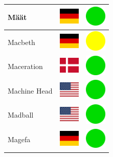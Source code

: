 \documentclass[12pt, a4paper, twoside]{report}
\begin{document}
\begin{center}
\begin{longtable}{|p{5cm}|p{2cm}|p{2cm}|}
 Määt                                                       & \includegraphics[width=1cm]{../4x3/de} &   \includegraphics[width=1cm]{../likes/y} \\ \hline
 Macbeth                                                    & \includegraphics[width=1cm]{../4x3/de} &   \includegraphics[width=1cm]{../likes/m} \\ \hline
 Maceration                                                 & \includegraphics[width=1cm]{../4x3/dk} &   \includegraphics[width=1cm]{../likes/y} \\ \hline
 Machine Head                                               & \includegraphics[width=1cm]{../4x3/us} &   \includegraphics[width=1cm]{../likes/y} \\ \hline
 Madball                                                    & \includegraphics[width=1cm]{../4x3/us} &   \includegraphics[width=1cm]{../likes/y} \\ \hline
 Magefa                                                     & \includegraphics[width=1cm]{../4x3/de} &   \includegraphics[width=1cm]{../likes/y} \\ \hline

\end{longtable}
\end{center}
\end{document}
